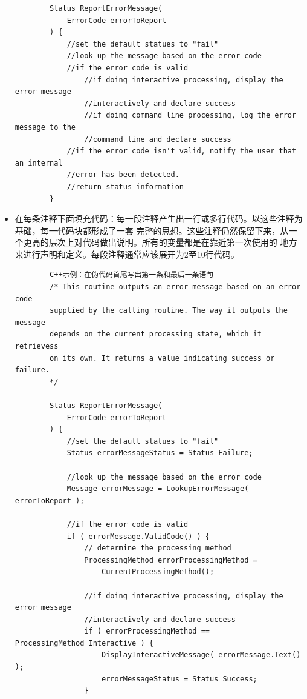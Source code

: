 \documentclass{article}
\begin{document}
\begin{itemize}
\begin{lstlisting}
        Status ReportErrorMessage(
            ErrorCode errorToReport
        ) {
            //set the default statues to "fail"
            //look up the message based on the error code
            //if the error code is valid
                //if doing interactive processing, display the error message
                //interactively and declare success
                //if doing command line processing, log the error message to the 
                //command line and declare success
            //if the error code isn't valid, notify the user that an internal 
            //error has been detected.
            //return status information
        }
    \end{lstlisting}
    \item 在每条注释下面填充代码：每一段注释产生出一行或多行代码。以这些注释为基础，每一代码块都形成了一套
    完整的思想。这些注释仍然保留下来，从一个更高的层次上对代码做出说明。所有的变量都是在靠近第一次使用的
    地方来进行声明和定义。每段注释通常应该展开为2至10行代码。
    \begin{lstlisting}
        C++示例：在伪代码首尾写出第一条和最后一条语句
        /* This routine outputs an error message based on an error code 
        supplied by the calling routine. The way it outputs the message 
        depends on the current processing state, which it retrievess
        on its own. It returns a value indicating success or failure.
        */

        Status ReportErrorMessage(
            ErrorCode errorToReport
        ) {
            //set the default statues to "fail"
            Status errorMessageStatus = Status_Failure;

            //look up the message based on the error code
            Message errorMessage = LookupErrorMessage( errorToReport );

            //if the error code is valid
            if ( errorMessage.ValidCode() ) {
                // determine the processing method
                ProcessingMethod errorProcessingMethod = 
                    CurrentProcessingMethod();

                //if doing interactive processing, display the error message
                //interactively and declare success
                if ( errorProcessingMethod == ProcessingMethod_Interactive ) {
                    DisplayInteractiveMessage( errorMessage.Text() );
                    errorMessageStatus = Status_Success;
                }


\end{lstlisting}
\end{itemize}
\end{document}
